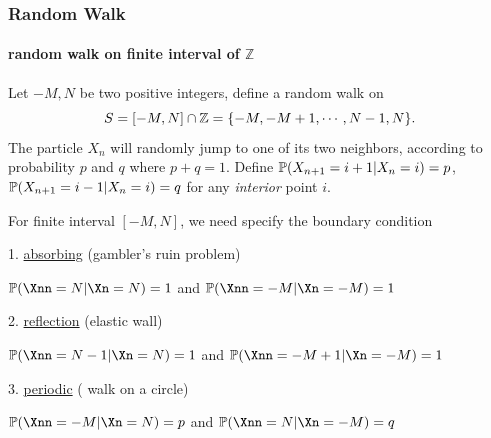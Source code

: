 \documentclass[english,10pt]{beamer}
\begin{document}
\begin{frame}
\frametitle{Random Walk}
\framesubtitle{  random walk  on finite interval of $\mathbb{Z}$}

 Let $-M,N$ be two positive integers, 
define a random walk on 
\[ S = [-M,N]\cap \mathbb{Z}
=\{-M,-M+1,\cdots, N-1,N\}.
\]
The particle $X_n$ will randomly jump to one of its two neighbors, 
according to probability $p$ and $q$ where $p+q=1$.
Define 
$\mathbb{P}(X_{n+1}=i+1| X_n=i) = p$, $\mathbb{P}(X_{n+1}=i-1| X_n=i) = q$
for any {\em interior} point $i$.

\medskip
\pause

For finite interval $[-M, N]$, we need specify the boundary condition

\begin{description}[<+->]
\item{1. \underline{absorbing} (gambler's ruin problem)}

$\p(\Xnn=N|\Xn=N)=1$ and 
$\p(\Xnn=-M|\Xn=-M)=1$

\item{2. \underline{reflection} (elastic wall)}

$\p(\Xnn=N-1|\Xn=N)=1$ and 
$\p(\Xnn=-M+1|\Xn=-M)=1$

\item{3. \underline{periodic} (  walk on a circle)}

$\p(\Xnn=-M|\Xn=N)=p$ and
$\p(\Xnn=N|\Xn=-M)=q$


\end{description}


\end{frame}
\end{document}
